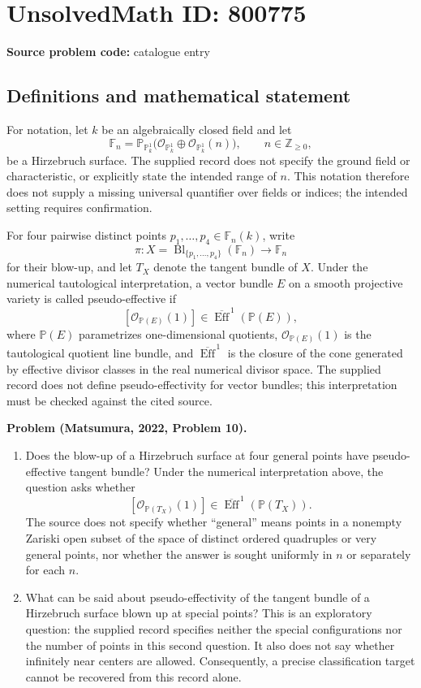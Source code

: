 \documentclass[11pt]{article}
\begin{document}
\section*{UnsolvedMath ID: 800775}
\textbf{Source problem code:} catalogue entry
\subsection{Definitions and mathematical statement}
For notation, let \(k\) be an algebraically closed field and let
\[
\mathbb F_n=\mathbb P_{\mathbb P^1_k}\bigl(\mathcal O_{\mathbb P^1_k}\oplus\mathcal O_{\mathbb P^1_k}(n)\bigr),\qquad n\in\mathbb Z_{\geq 0},
\]
be a Hirzebruch surface. The supplied record does not specify the ground field or characteristic, or explicitly state the intended range of \(n\). This notation therefore does not supply a missing universal quantifier over fields or indices; the intended setting requires confirmation.

For four pairwise distinct points \(p_1,\ldots,p_4\in\mathbb F_n(k)\), write
\[
\pi:X=\operatorname{Bl}_{\{p_1,\ldots,p_4\}}(\mathbb F_n)\longrightarrow\mathbb F_n
\]
for their blow-up, and let \(T_X\) denote the tangent bundle of \(X\). Under the numerical tautological interpretation, a vector bundle \(E\) on a smooth projective variety is called pseudo-effective if
\[
[\mathcal O_{\mathbb P(E)}(1)]\in\overline{\operatorname{Eff}}^{\,1}(\mathbb P(E)),
\]
where \(\mathbb P(E)\) parametrizes one-dimensional quotients, \(\mathcal O_{\mathbb P(E)}(1)\) is the tautological quotient line bundle, and \(\overline{\operatorname{Eff}}^{\,1}\) is the closure of the cone generated by effective divisor classes in the real numerical divisor space. The supplied record does not define pseudo-effectivity for vector bundles; this interpretation must be checked against the cited source.

\textbf{Problem (Matsumura, 2022, Problem 10).}
\begin{enumerate}
\item Does the blow-up of a Hirzebruch surface at four general points have pseudo-effective tangent bundle? Under the numerical interpretation above, the question asks whether
\[
[\mathcal O_{\mathbb P(T_X)}(1)]\in\overline{\operatorname{Eff}}^{\,1}(\mathbb P(T_X)).
\]
The source does not specify whether ``general'' means points in a nonempty Zariski open subset of the space of distinct ordered quadruples or very general points, nor whether the answer is sought uniformly in \(n\) or separately for each \(n\).
\item What can be said about pseudo-effectivity of the tangent bundle of a Hirzebruch surface blown up at special points? This is an exploratory question: the supplied record specifies neither the special configurations nor the number of points in this second question. It also does not say whether infinitely near centers are allowed. Consequently, a precise classification target cannot be recovered from this record alone.
\end{enumerate}
\end{document}
